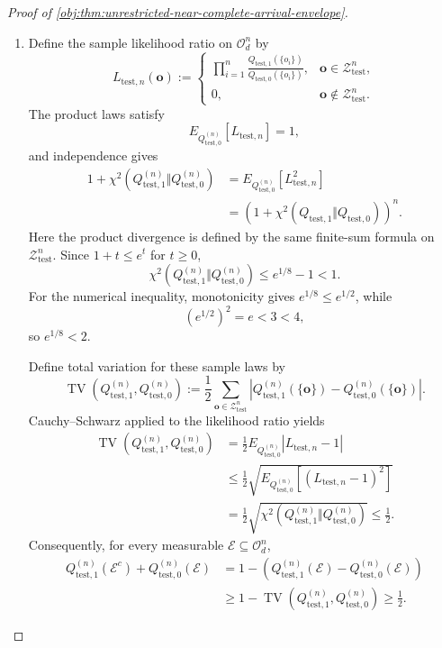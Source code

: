 \begin{proof}[Proof of \cref{obj:thm:unrestricted-near-complete-arrival-envelope}]
\begin{enumerate}
\item Define the sample likelihood ratio on \(\mathcal O_d^n\) by
\[
L_{\mathrm{test},n}(\mathbf o)
:=
\begin{cases}
\displaystyle\prod_{i=1}^{n}
\frac{Q_{\mathrm{test},1}(\{o_i\})}
{Q_{\mathrm{test},0}(\{o_i\})},
&\mathbf o\in\mathcal Z_{\mathrm{test}}^n,\\
0,&\mathbf o\notin\mathcal Z_{\mathrm{test}}^n.
\end{cases}
\]
The product laws satisfy
\[
E_{Q_{\mathrm{test},0}^{(n)}}[L_{\mathrm{test},n}]=1,
\]
and independence gives
\[
\begin{aligned}
1+\chi^2(Q_{\mathrm{test},1}^{(n)}\Vert Q_{\mathrm{test},0}^{(n)})
&=
E_{Q_{\mathrm{test},0}^{(n)}}[L_{\mathrm{test},n}^2]\\
&=
\left(
1+\chi^2(Q_{\mathrm{test},1}\Vert Q_{\mathrm{test},0})
\right)^n.
\end{aligned}
\]
Here the product divergence is defined by the same finite-sum formula on
\(\mathcal Z_{\mathrm{test}}^n\). Since \(1+t\le e^t\) for \(t\ge0\),
\[
\chi^2(Q_{\mathrm{test},1}^{(n)}\Vert Q_{\mathrm{test},0}^{(n)})
\le e^{1/8}-1<1.
\]
For the numerical inequality, monotonicity gives \(e^{1/8}\le e^{1/2}\), while
\[
(e^{1/2})^2=e<3<4,
\]
so \(e^{1/8}<2\).

Define total variation for these sample laws by
\[
\operatorname{TV}(Q_{\mathrm{test},1}^{(n)},Q_{\mathrm{test},0}^{(n)})
:=
\frac12
\sum_{\mathbf o\in\mathcal Z_{\mathrm{test}}^n}
\left|
Q_{\mathrm{test},1}^{(n)}(\{\mathbf o\})
-
Q_{\mathrm{test},0}^{(n)}(\{\mathbf o\})
\right|.
\]
Cauchy--Schwarz applied to the likelihood ratio yields
\[
\begin{aligned}
\operatorname{TV}(Q_{\mathrm{test},1}^{(n)},Q_{\mathrm{test},0}^{(n)})
&=
\frac12E_{Q_{\mathrm{test},0}^{(n)}}|L_{\mathrm{test},n}-1|\\
&\le
\frac12\sqrt{
E_{Q_{\mathrm{test},0}^{(n)}}[(L_{\mathrm{test},n}-1)^2]
}\\
&=
\frac12\sqrt{
\chi^2(Q_{\mathrm{test},1}^{(n)}\Vert Q_{\mathrm{test},0}^{(n)})
}
\le\frac12.
\end{aligned}
\]
Consequently, for every measurable \(\mathcal E\subseteq\mathcal O_d^n\),
\[
\begin{aligned}
Q_{\mathrm{test},1}^{(n)}(\mathcal E^c)
+Q_{\mathrm{test},0}^{(n)}(\mathcal E)
&=
1-\left(
Q_{\mathrm{test},1}^{(n)}(\mathcal E)
-Q_{\mathrm{test},0}^{(n)}(\mathcal E)
\right)\\
&\ge
1-\operatorname{TV}(Q_{\mathrm{test},1}^{(n)},Q_{\mathrm{test},0}^{(n)})
\ge\frac12.
\end{aligned}
\]


\end{enumerate}
\end{proof}
